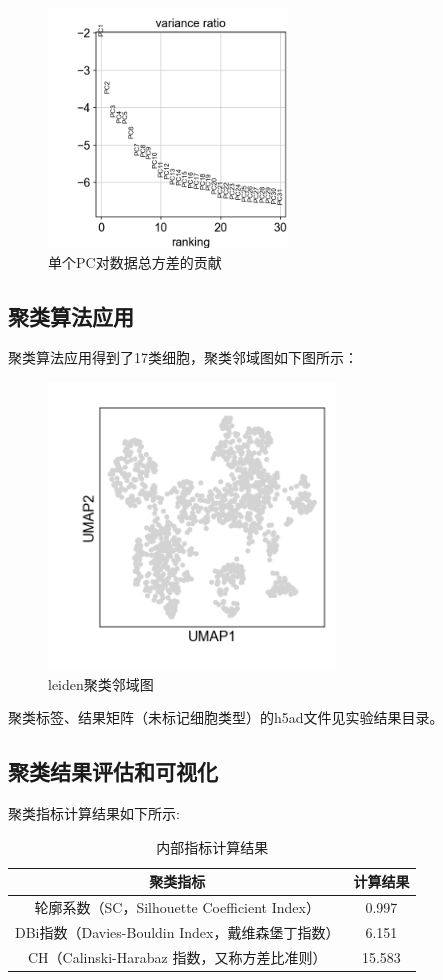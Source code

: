 \documentclass {article}
\begin{document}
	\begin{figure}[H]
		\centering
		\includegraphics[width=2.5in,height=2.5in]{figures/fig2.png}
		\caption{单个PC对数据总方差的贡献}
	\end{figure}
	
	\subsection{聚类算法应用}
	聚类算法应用得到了17类细胞，聚类邻域图如下图所示：
	\begin{figure}[H]
		\centering
		\includegraphics[width=3in,height=3in]{figures/fig3.png}
		\caption{leiden聚类邻域图}
	\end{figure}
	
	聚类标签、结果矩阵（未标记细胞类型）的h5ad文件见实验结果目录。
	
	\subsection{聚类结果评估和可视化}
	聚类指标计算结果如下所示:
	\begin{table}[H]
		\centering
		\caption{内部指标计算结果}
		\begin{tabular}{cc}
			\hline
			聚类指标 & 计算结果 \\
			\hline
			轮廓系数（SC，Silhouette Coefficient Index） & 0.997 \\
			DBi指数（Davies-Bouldin Index，戴维森堡丁指数）& 6.151 \\
			CH（Calinski-Harabaz 指数，又称方差比准则） & 15.583 \\
			\hline                                                                               
		\end{tabular}
	\end{table}
	
\end{document}
